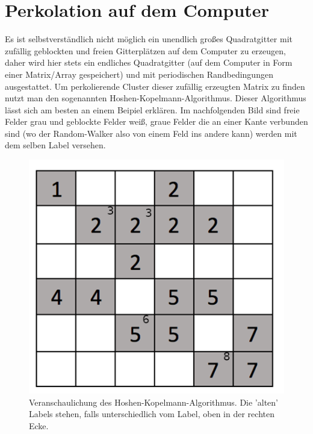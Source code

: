 \documentclass[a4paper, 12pt]{report}
\begin{document}
\section{Perkolation auf dem Computer}
Es ist selbstverständlich nicht möglich ein unendlich großes Quadratgitter mit zufällig geblockten und freien Gitterplätzen auf dem Computer zu erzeugen, daher wird hier stets ein endliches Quadratgitter (auf dem Computer in Form einer Matrix/Array gespeichert) und mit periodischen Randbedingungen ausgestattet. Um perkolierende Cluster dieser zufällig erzeugten Matrix zu finden nutzt man den sogenannten Hoshen-Kopelmann-Algorithmus.\cite{Fricke}
Dieser Algorithmus lässt sich am besten an einem Beipiel erklären. Im nachfolgenden Bild sind freie Felder grau und geblockte Felder weiß, graue Felder die an einer Kante verbunden sind (wo der Random-Walker also von einem Feld ins andere kann) werden mit dem selben Label versehen.
\begin{figure}[h!]
	\centering
	\includegraphics[scale=0.5]{H-K_algorithm.png}
	\caption{Veranschaulichung des Hoshen-Kopelmann-Algorithmus. Die 'alten' Labels stehen, falls unterschiedlich vom Label, oben in der rechten Ecke.}
\end{figure}

\newpage
\end{document}
